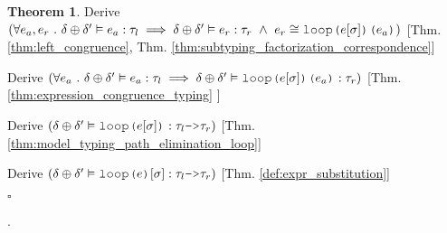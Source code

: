 \documentclass[acmsmall]{acmart}
\theoremstyle{definition}
\newtheorem{theorem}{Theorem}[section]
\newtheorem{definition}{Definition}[section]
\begin{document}
\begin{theorem}
  \item \I\I \N Derive $(
    \forall e_a, e_r \qua 
    \delta \oplus \delta' \satisfies e_a \hastype \tau_l 
    \implies 
    \delta \oplus \delta' \satisfies e_r \hastype \tau_r 
    \up
    e_r \cong \J{loop(}e[\sigma]\J{)(} e_a \J{)}
  )$ [Thm. \ref{thm:left_congruence}, Thm. \ref{thm:subtyping_factorization_correspondence}]

  \item \I\I \N Derive $(
    \forall e_a \qua 
    \delta \oplus \delta' \satisfies e_a \hastype \tau_l 
    \implies 
    \delta \oplus \delta' \satisfies \J{loop(}e[\sigma]\J{)(} e_a \J{)} \hastype \tau_r 
  )$ [Thm. \ref{thm:expression_congruence_typing} ]

  \item \I\I \N Derive $(
    \delta \oplus \delta'  \satisfies \J{loop(}e[\sigma]\J{)} \hastype \tau_l \J{->}\tau_r 
  )$ [Thm. \ref{thm:model_typing_path_elimination_loop}]

  \item \I\I \N Derive $(
    \delta \oplus \delta'  \satisfies \J{loop(}e\J{)}[\sigma] \hastype \tau_l \J{->}\tau_r 
  )$ [Thm. \ref{def:expr_substitution}]

  \noindent
  $\square$

\end{theorem}


.





\end{document}

